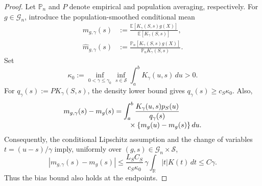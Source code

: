 \documentclass[10pt]{article}
\begin{document}
\begin{proof}
Let \(\mathbb P_n\) and \(P\) denote empirical and population averaging,
respectively.  For \(g\in\mathcal G_n\), introduce the population-smoothed
conditional mean
\begin{align*}
  m_{g,\gamma}(s)
  &:=\frac{\mathbb E[K_\gamma(S,s)g(X)]}
           {\mathbb E[K_\gamma(S,s)]},\\
  \widehat m_{g,\gamma}(s)
  &:=\frac{\mathbb P_n[K_\gamma(S,s)g(X)]}
           {\mathbb P_nK_\gamma(S,s)}.
\end{align*}
Set
\[
  \kappa_0:=
  \inf_{0<\gamma\le\gamma_0}\inf_{s\in\mathcal S}
  \int_a^bK_\gamma(u,s)\,du>0.
\]
For \(q_\gamma(s):=P K_\gamma(S,s)\), the density lower bound gives
\(q_\gamma(s)\ge c_S\kappa_0\).  Also,
\begin{align*}
  m_{g,\gamma}(s)-m_g(s)
  &=\int_a^b\frac{K_\gamma(u,s)p_S(u)}{q_\gamma(s)}\notag\\[-1mm]
  &\qquad\times\{m_g(u)-m_g(s)\}\,du.
\end{align*}
Consequently, the conditional Lipschitz assumption and the change of
variables \(t=(u-s)/\gamma\) imply, uniformly over
\((g,s)\in\mathcal G_n\times\mathcal S\),
\begin{equation}
  |m_{g,\gamma}(s)-m_g(s)|
  \le \frac{L_SC_S}{c_S\kappa_0}\,
       \gamma\int_{\mathbb R}|t|K(t)\,dt
  \le C\gamma.
  \label{eq:uniform-kernel-bias}
\end{equation}
Thus the bias bound also holds at the endpoints.


\end{proof}
\end{document}
